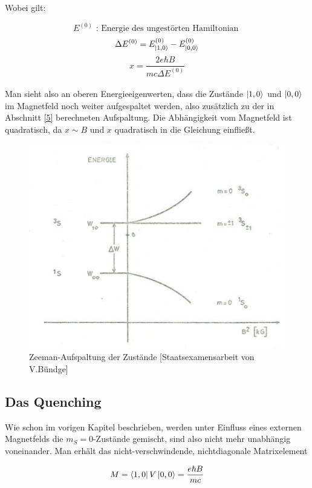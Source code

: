 Wobei gilt:

$$ E^{(0)} \text{ : Energie des ungestörten Hamiltonian \ } $$
$$ \Delta E^{(0)} = E_{\ket{1,0}}^{(0)} - E_{\ket{0,0}}^{(0)} $$
\begin{equation} x = \frac{2e\hbar B}{mc\Delta E^{(0)}} \end{equation} \\

Man sieht also an oberen Energieeigenwerten, dass die Zustände $\ket{1,0}$ und $\ket{0,0}$ im Magnetfeld noch weiter aufgespaltet werden, also zusätzlich zu der in Abschnitt \ref{5} berechneten Aufspaltung. Die Abhängigkeit vom Magnetfeld ist quadratisch, da $x\sim B$ und $x$ quadratisch in die Gleichung einfließt.

\begin{figure}[H]
\centering \includegraphics[width=\textwidth]{BilderTheorie/Zeeman.png}
\caption{Zeeman-Aufspaltung der Zustände [Staatsexamensarbeit von V.Bündge]}
\end{figure}

\subsection{Das Quenching}

Wie schon im vorigen Kapitel beschrieben, werden unter Einfluss eines externen Magnetfelds die $m_S = 0$-Zustände gemischt, sind also nicht mehr unabhängig voneinander. Man erhält das nicht-verschwindende, nichtdiagonale Matrixelement 

$$ M = \bra{1,0} V \ket{0,0} = \frac{e\hbar B}{mc} $$

